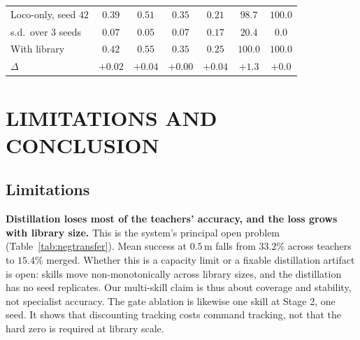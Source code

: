 \documentclass[letterpaper, 10 pt, conference]{ieeeconf}  %
\begin{document}
\begin{table}[htbp]
\begin{tabular}{@{}lcccccc@{}}
Loco-only, seed $42$ & $0.39$ & $0.51$ & $0.35$ & $0.21$ & $98.7$ & $100.0$ \\
\;\;s.d.\ over $3$ seeds & $0.07$ & $0.05$ & $0.07$ & $0.17$ & $20.4$ & $0.0$ \\
With library & $0.42$ & $0.55$ & $0.35$ & $0.25$ & $100.0$ & $100.0$ \\
$\Delta$ & $+0.02$ & $+0.04$ & $+0.00$ & $+0.04$ & $+1.3$ & $+0.0$ \\
\bottomrule
\end{tabular}

\end{table}

\section{LIMITATIONS AND CONCLUSION}
\label{sec:limitations}

\subsection{Limitations}

\textbf{Distillation loses most of the teachers' accuracy, and the loss grows
with library size.} This is the system's principal open problem
(Table~\ref{tab:negtransfer}). Mean success at $0.5$\,m falls from $33.2\%$
across teachers to $15.4\%$ merged. Whether this is a capacity limit or a fixable
distillation artifact is open: skills move non-monotonically across library
sizes, and the distillation has no seed replicates.
Our multi-skill claim is thus about coverage and stability, not specialist
accuracy. The gate ablation is likewise one skill at Stage 2, one seed. It shows that
discounting tracking costs command tracking, not that the hard zero is
required at library scale.
\end{document}
